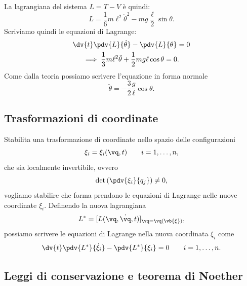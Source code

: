 \begin{example}
    La lagrangiana del sistema $L = T - V$ è quindi:
    \begin{equation*}
        L = \frac{1}{6}m\ell^2\dot{\theta}^2 - mg\frac{\ell}{2}\sin\theta.
    \end{equation*}
    Scriviamo quindi le equazioni di Lagrange:
    \begin{gather*}
        \dv{t}\pdv{L}{\dot{\theta}} - \pdv{L}{\theta} = 0 \\
        \implies \frac{1}{3}m\ell^2\ddot{\theta} + \frac{1}{2}mg\ell\cos\theta = 0.
    \end{gather*}
    Come dalla teoria possiamo scrivere l'equazione in forma normale
    \begin{equation*}
        \ddot{\theta} = -\frac{3}{2}\frac{g}{\ell}\cos\theta.
    \end{equation*}
\end{example}


\subsection{Trasformazioni di coordinate}
Stabilita una trasformazione di coordinate nello spazio delle configurazioni
\begin{equation*}
    \xi_i = \xi_i(\vq, t) \qquad i = 1, \dots, n,
\end{equation*}
che sia localmente invertibile, ovvero
\begin{equation*}
    \det\left(\pdv{\xi_i}{q_j}\right) \neq 0,
\end{equation*}
vogliamo stabilire che forma prendono le equazioni di Lagrange nelle nuove coordinate $\xi_i$. Definendo la nuova lagrangiana
\begin{equation*}
    L^* = [L(\vq, \dot{\vq}, t)]_{\vq = \vq(\vb{\xi})},
\end{equation*}
possiamo scrivere le equazioni di Lagrange nella nuova coordinata $\xi_i$ come
\begin{equation*}
    \dv{t}\pdv{L^*}{\dot{\xi}_i} - \pdv{L^*}{\xi_i} = 0 \qquad i = 1, \dots, n.
\end{equation*}

\subsection{Leggi di conservazione e teorema di Noether}

